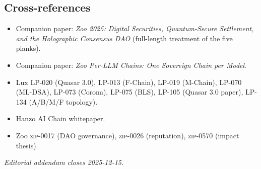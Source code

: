\subsection{Cross-references}

\begin{itemize}[nosep,leftmargin=1.2em]
\item Companion paper: \emph{Zoo 2025: Digital Securities,
   Quantum-Secure Settlement, and the Holographic Consensus DAO}
   (full-length treatment of the five planks).
\item Companion paper: \emph{Zoo Per-LLM Chains: One Sovereign Chain
   per Model}.
\item Lux LP-020 (Quasar 3.0), LP-013 (F-Chain), LP-019 (M-Chain),
   LP-070 (ML-DSA), LP-073 (Corona), LP-075 (BLS), LP-105 (Quasar
   3.0 paper), LP-134 (A/B/M/F topology).
\item Hanzo AI Chain whitepaper.
\item Zoo \textsc{zip-0017} (DAO governance), \textsc{zip-0026}
   (reputation), \textsc{zip-0570} (impact thesis).
\end{itemize}

\medskip
\noindent\textit{Editorial addendum closes 2025-12-15.}
